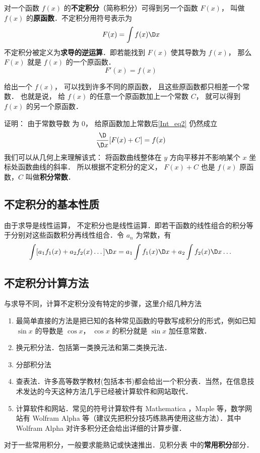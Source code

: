 

对一个函数 $f(x)$ 的\textbf{不定积分}（简称积分）可得到另一个函数 $F(x)$， 叫做 $f(x)$ 的\textbf{原函数}．不定积分用符号表示为
\begin{equation}\label{Int_eq1}
F(x) = \int {f(x)\D x} 
\end{equation}
不定积分被定义为\textbf{求导的逆运算}．即若能找到 $F(x)$ 使其导数为 $f(x)$， 那么 $F(x)$ 就是  $f(x)$ 的一个原函数．
\begin{equation}\label{Int_eq2}
F'(x) = f(x)
\end{equation}

给出一个 $f(x)$， 可以找到许多不同的原函数， 且这些原函数都只相差一个常数． 也就是说， 给 $f(x)$ 的任意一个原函数加上一个常数 $C$， 就可以得到 $f(x)$ 的另一个原函数． 

证明： 由于常数导数%
为 $0$， 给原函数加上常数后\autoref{Int_eq2} 仍然成立
\begin{equation}\label{Int_eq3}
\frac{\D}{\D x}[F(x) + C] = f(x)
\end{equation}
我们可以从几何上来理解该式： 将函数曲线整体在 $y$ 方向平移并不影响某个 $x$ 坐标处函数曲线的斜率．
所以根据不定积分的定义， $F(x) + C$ 也是 $f(x)$ 原函数，$C$ 叫做\textbf{积分常数}．

\subsection{不定积分的基本性质}%

由于求导是线性运算，%
不定积分也是线性运算．即若干函数的线性组合的积分等于分别对这些函数积分再线性组合．令 $a_n$ 为常数，有
\begin{equation}\label{Int_eq4}
\int [a_1 f_1(x) + a_2 f_2(x)\dots]\D x  = a_1 \int {f_1(x)\D x} + a_2 \int {f_2(x)\D x} \dots
\end{equation}

\subsection{不定积分计算方法}
与求导不同，计算不定积分没有特定的步骤，这里介绍几种方法
\begin{enumerate}
\item 最简单直接的方法是把已知的各种常见函数的导数写成积分的形式，例如已知 $\sin x$ 的导数是 $\cos x$， $\cos x$ 的积分就是 $\sin x$ 加任意常数．
\item 换元积分法．包括第一类换元法和第二类换元法．

\item 分部积分法%

\item 查表法．许多高等数学教材(包括本书)都会给出一个积分表．当然，在信息技术发达的今天这种方法几乎已经被计算软件和网站取代．

\item 计算软件和网站．常见的符号计算软件有 Mathematica %
，Maple 等，数学网站有 Wolfram Alpha %
等（建议先把积分技巧练熟再使用这些方法）．其中 Wolfram Alpha 对许多积分还会给出详细的计算步骤．
 \end{enumerate}


对于一些常用积分，一般要求能熟记或快速推出．见积分表 中的\textbf{常用积分}部分．%



